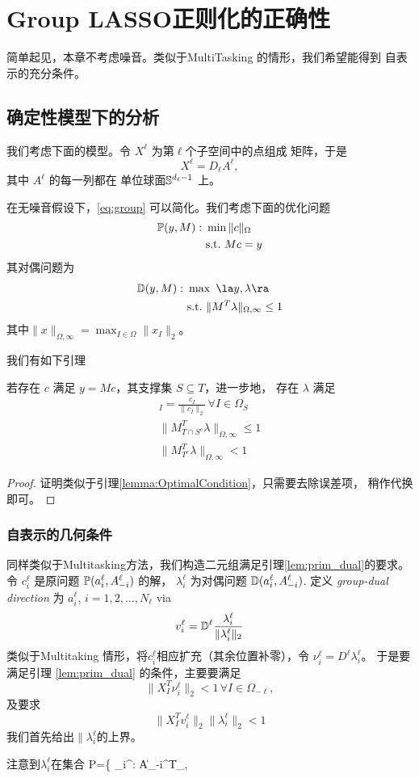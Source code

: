 \documentclass[main.tex]{subfiles}
\begin{document}
\chapter{Group LASSO正则化的正确性}\label{chp:proof_group}
简单起见，本章不考虑噪音。类似于MultiTasking 的情形，我们希望能得到
自表示的充分条件。

\section{确定性模型下的分析}
我们考虑下面的模型。令 $X^\ell$ 为第$\ell$个子空间中的点组成
矩阵，于是
$$ X^\ell = D_\ell A^{\ell} ,$$ 
其中 $A^\ell$ 的每一列都在 单位球面$\S^{d_\ell-1}$ 上。

在无噪音假设下，\ref{eq:group} 可以简化。我们考虑下面的优化问题
\begin{align}
  \P(y,M): \,\, & \min \| c\|_{\Omega} \\
                & \mbox{s.t.}\,\, Mc = y
  \label{eq:group_primal}
\end{align}
其对偶问题为 
\begin{align}
  \D(y,M): \,\, &\max \,\, \la y, \lambda\ra \\
                & \mbox{s.t.}\,\, \|M^T\lambda\|_{\Omega,\infty} \leq 1
\end{align}
其中$\|x\|_{\Omega, \infty} = \max_{I \in \Omega} \|x_I\|_2$。

我们有如下引理 
\begin{lemma}
  \label{lem:prim_dual}
  若存在 $c$ 满足 $y = Mc$，其支撑集 $S \subseteq T$，进一步地，
  存在 $\lambda$ 满足
  \begin{align*}
    [M_{S}^T \lambda]_I = \frac{c_I}{\|c_I\|_2} \, \forall I \in \Omega_S\\
    \|M_{T\cap S^c}^T \lambda\|_{\Omega,\infty} \leq 1 \\
    \|M_{T^c}^T \lambda\|_{\Omega,\infty} < 1
  \end{align*}
\end{lemma}
\begin{proof}
  证明类似于引理\ref{lemma:OptimalCondition}，只需要去除误差项，
  稍作代换即可。
\end{proof}

\subsection{自表示的几何条件}
同样类似于Multitasking方法，我们构造二元组满足引理\ref{lem:prim_dual}的要求。
令 $c_{i}^{\ell}$ 是原问题 $\P(a_i^{\ell}, A_{-i}^{\ell})$ 的解，
$\lambda_i^{\ell}$ 为对偶问题 $\D(a_{i}^{\ell}, A_{-i}^{\ell})$.
定义 \emph{group-dual direction} 为 $a_{i}^{\ell}$, $i = 1,2,...,N_\ell$ via 
$$ v_i^\ell = \D^{\ell} \frac{\lambda_i^\ell}{\|\lambda_i^\ell \|_2} $$
类似于Multitaking 情形，将$c_i^{\ell}$相应扩充（其余位置补零），令 $\nu_i^\ell
= D^{\ell} \lambda_i^\ell$。 于是要满足引理 \ref{lem:prim_dual}
的条件，主要要满足 
$$ \| X^T_I \nu_i^\ell\|_2 < 1 \, \forall I \in \Omega_{-\ell},$$
及要求
$$\| X^T_I v_i^\ell\|_2 \|\lambda_i^\ell\|_2 < 1$$
我们首先给出$\|\lambda_i^\ell$的上界。

注意到$\lambda_i^\ell$在集合
$$P=\{ \lambda_i^\ell: \|A_{-i}^{\ell T}\|_{\Omega,\infity}

\subsection{}
\end{document}
